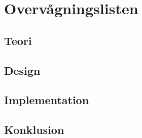 \section{Overvågningslisten}
\subsection{Teori}
\subsection{Design}
\subsection{Implementation}
\subsection{Konklusion}
